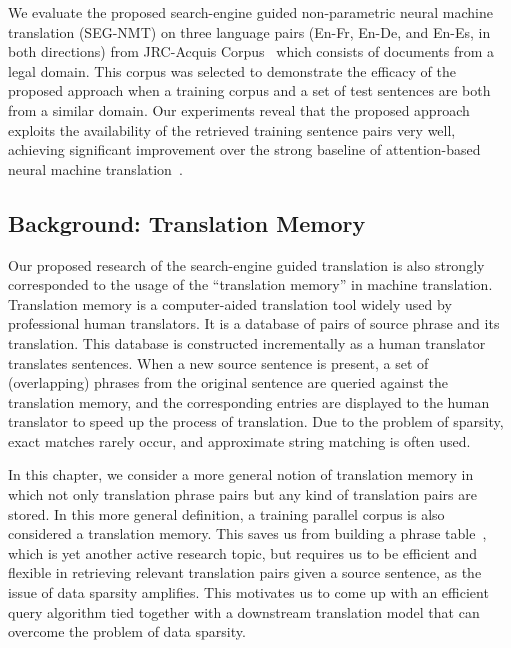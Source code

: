 We evaluate the proposed search-engine guided non-parametric neural machine translation (SEG-NMT) on three language pairs (En-Fr, En-De, and En-Es, in both directions) from JRC-Acquis Corpus~\citep{steinberger2006jrc} which consists of documents from a legal domain. This corpus was selected to demonstrate the efficacy of the proposed approach when a training corpus and a set of test sentences are both from a similar domain. Our experiments reveal that the proposed approach exploits the availability of the retrieved training sentence pairs very well, achieving significant improvement over the strong baseline of attention-based neural machine translation~\citep{bahdanau2014neural}.

\subsection{Background: Translation Memory}
Our proposed research of the search-engine guided translation is also strongly corresponded to the usage of the ``translation memory'' in machine translation.
Translation memory is a computer-aided translation tool widely used by professional human translators. It is a database of pairs of source phrase and its translation. This database is constructed incrementally as a human translator translates sentences. When a new source sentence is present, a set of (overlapping) phrases from the original sentence are queried against the translation memory, and the corresponding entries are displayed to the human translator to speed up the process of translation. Due to the problem of sparsity, exact matches rarely occur, and approximate string matching is often used.

In this chapter, we consider a more general notion of translation memory in which not only translation phrase pairs but any kind of translation pairs are stored. In this more general definition, a training parallel corpus is also considered a translation memory. This saves us from building a phrase table~\citep{koehn2003statistical}, which is yet another active research topic, but requires us to be efficient and flexible in retrieving relevant translation pairs given a source sentence, as the issue of data sparsity amplifies. This motivates us to come up with an efficient query algorithm tied together with a downstream translation model that can overcome the problem of data sparsity.

